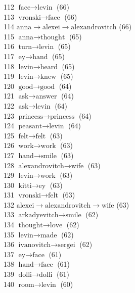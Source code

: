 \begin{appendices}
   112  $ \text{face} \to \text{levin} $ (66) \\
   113  $ \text{vronski} \to \text{face} $ (66) \\
   114  $ \text{anna} \to \text{alexei} \to \text{alexandrovitch} $ (66) \\
   115  $ \text{anna} \to \text{thought} $ (65) \\
   116  $ \text{turn} \to \text{levin} $ (65) \\
   117  $ \text{ey} \to \text{hand} $ (65) \\
   118  $ \text{levin} \to \text{heard} $ (65) \\
   119  $ \text{levin} \to \text{knew} $ (65) \\
   120  $ \text{good} \to \text{good} $ (64) \\
   121  $ \text{ask} \to \text{answer} $ (64) \\
   122  $ \text{ask} \to \text{levin} $ (64) \\
   123  $ \text{princess} \to \text{princess} $ (64) \\
   124  $ \text{peasant} \to \text{levin} $ (64) \\
   125  $ \text{felt} \to \text{felt} $ (63) \\
   126  $ \text{work} \to \text{work} $ (63) \\
   127  $ \text{hand} \to \text{smile} $ (63) \\
   128  $ \text{alexandrovitch} \to \text{wife} $ (63) \\
   129  $ \text{levin} \to \text{work} $ (63) \\
   130  $ \text{kitti} \to \text{ey} $ (63) \\
   131  $ \text{vronski} \to \text{felt} $ (63) \\
   132  $ \text{alexei} \to \text{alexandrovitch} \to \text{wife} $ (63) \\
   133  $ \text{arkadyevitch} \to \text{smile} $ (62) \\
   134  $ \text{thought} \to \text{love} $ (62) \\
   135  $ \text{levin} \to \text{made} $ (62) \\
   136  $ \text{ivanovitch} \to \text{sergei} $ (62) \\
   137  $ \text{ey} \to \text{face} $ (61) \\
   138  $ \text{hand} \to \text{face} $ (61) \\
   139  $ \text{dolli} \to \text{dolli} $ (61) \\
   140  $ \text{room} \to \text{levin} $ (60) \\

\end{appendices}
